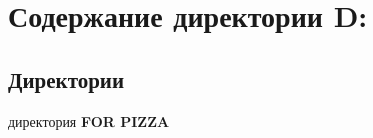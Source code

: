 \section{Содержание директории D\+:}
\label{dir_275089585c7fc1b5fd5d7d42c69cb1da}
\subsection*{Директории}
\begin{DoxyCompactItemize}
\item 
директория \textbf{ F\+O\+R P\+I\+Z\+ZA}
\end{DoxyCompactItemize}
